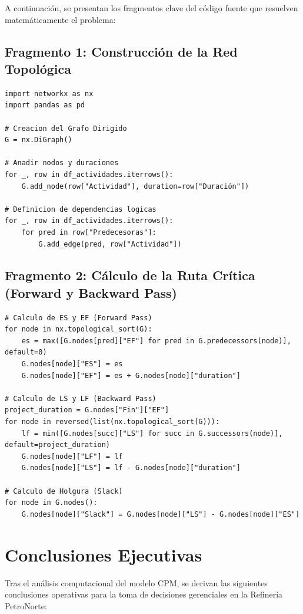 \documentclass[11pt,a4paper]{article}
\begin{document}
A continuación, se presentan los fragmentos clave del código fuente que resuelven matemáticamente el problema:

\subsection*{Fragmento 1: Construcción de la Red Topológica}
\begin{lstlisting}
import networkx as nx
import pandas as pd

# Creacion del Grafo Dirigido
G = nx.DiGraph()

# Anadir nodos y duraciones
for _, row in df_actividades.iterrows():
    G.add_node(row["Actividad"], duration=row["Duración"])

# Definicion de dependencias logicas
for _, row in df_actividades.iterrows():
    for pred in row["Predecesoras"]:
        G.add_edge(pred, row["Actividad"])
\end{lstlisting}

\subsection*{Fragmento 2: Cálculo de la Ruta Crítica (Forward y Backward Pass)}
\begin{lstlisting}
# Calculo de ES y EF (Forward Pass)
for node in nx.topological_sort(G):
    es = max([G.nodes[pred]["EF"] for pred in G.predecessors(node)], default=0)
    G.nodes[node]["ES"] = es
    G.nodes[node]["EF"] = es + G.nodes[node]["duration"]

# Calculo de LS y LF (Backward Pass)
project_duration = G.nodes["Fin"]["EF"]
for node in reversed(list(nx.topological_sort(G))):
    lf = min([G.nodes[succ]["LS"] for succ in G.successors(node)], default=project_duration)
    G.nodes[node]["LF"] = lf
    G.nodes[node]["LS"] = lf - G.nodes[node]["duration"]
    
# Calculo de Holgura (Slack)
for node in G.nodes():
    G.nodes[node]["Slack"] = G.nodes[node]["LS"] - G.nodes[node]["ES"]
\end{lstlisting}

\section{Conclusiones Ejecutivas}

Tras el análisis computacional del modelo CPM, se derivan las siguientes conclusiones operativas para la toma de decisiones gerenciales en la Refinería PetroNorte:
\end{document}
